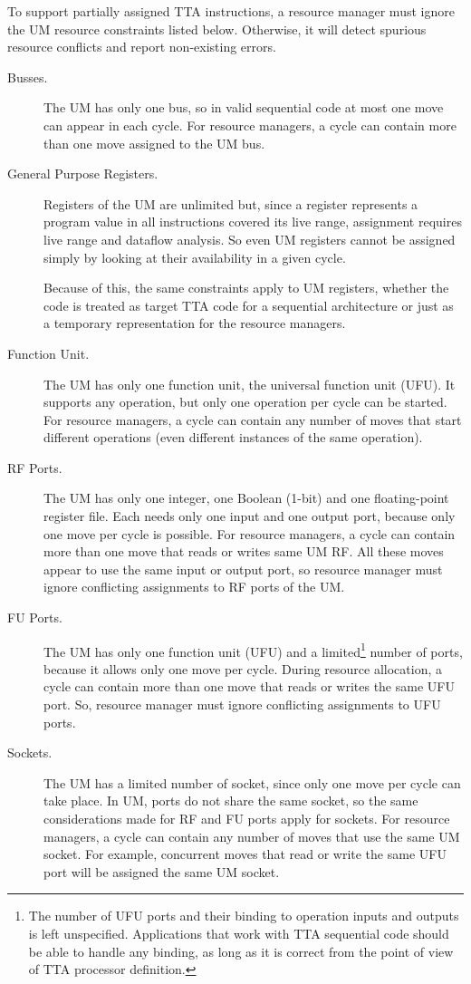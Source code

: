 \documentclass[a4paper,twoside]{tce}
\begin{document}
To support partially assigned TTA instructions, a resource manager must
ignore the UM resource constraints listed below. Otherwise, it will detect
spurious resource conflicts and report non-existing errors.
%
\begin{description}
\item[Busses.]%
  The UM has only one bus, so in valid sequential code at most one move can
  appear in each cycle. For resource managers, a cycle can contain more
  than one move assigned to the UM bus.

\item[General Purpose Registers.]%
  Registers of the UM are unlimited but, since a register represents a
  program value in all instructions covered its live range, assignment
  requires live range and dataflow analysis. So even UM registers cannot be
  assigned simply by looking at their availability in a given cycle.

  Because of this, the same constraints apply to UM registers, whether the
  code is treated as target TTA code for a sequential architecture or just
  as a temporary representation for the resource managers.

\item[Function Unit.]%
  The UM has only one function unit, the universal function unit (UFU). It
  supports any operation, but only one operation per cycle can be started.
  For resource managers, a cycle can contain any number of moves that start
  different operations (even different instances of the same operation).

\item[RF Ports.]%
  The UM has only one integer, one Boolean (1-bit) and one floating-point
  register file. Each needs only one input and one output port, because only
  one move per cycle is possible. For resource managers, a cycle can contain
  more than one move that reads or writes same UM RF. All these moves appear
  to use the same input or output port, so resource manager must ignore
  conflicting assignments to RF ports of the UM.

\item[FU Ports.]%
  The UM has only one function unit (UFU) and a limited\footnote{
%
    The number of UFU ports and their binding to operation inputs and
    outputs is left unspecified. Applications that work with TTA sequential
    code should be able to handle any binding, as long as it is correct from
    the point of view of TTA processor definition.}
%
  number of ports, because it allows only one move per cycle. During
  resource allocation, a cycle can contain more than one move that reads or
  writes the same UFU port. So, resource manager must ignore conflicting
  assignments to UFU ports.

\item[Sockets.]%
  The UM has a limited number of socket, since only one move per cycle can
  take place. In UM, ports do not share the same socket, so the same
  considerations made for RF and FU ports apply for sockets. For resource
  managers, a cycle can contain any number of moves that use the same UM
  socket. For example, concurrent moves that read or write the same UFU port
  will be assigned the same UM socket.
\end{description}
\end{document}
